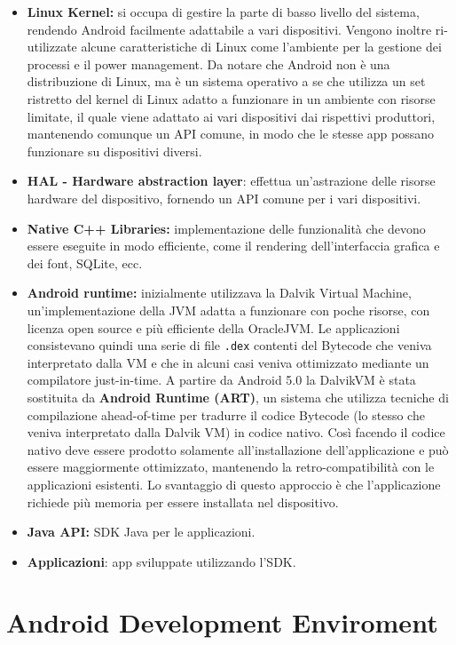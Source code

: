 \begin{itemize}
	\item \textbf{Linux Kernel:} si occupa di gestire la parte di basso livello
		del sistema, rendendo Android facilmente adattabile a vari
		dispositivi. Vengono inoltre ri-utilizzate alcune caratteristiche di
		Linux come l'ambiente per la gestione dei processi e il power
		management. Da notare che Android non è una distribuzione di Linux, ma
		è un sistema operativo a se che utilizza un set ristretto del kernel
		di Linux adatto a funzionare in un ambiente con risorse limitate, il
		quale viene adattato ai vari dispositivi dai rispettivi produttori,
		mantenendo comunque un API comune, in modo che le stesse app possano
		funzionare su dispositivi diversi.
	\item
		\textbf{HAL - Hardware abstraction layer}: effettua un'astrazione
		delle risorse hardware del dispositivo, fornendo un API comune per i
		vari dispositivi.
	\item
		\textbf{Native C++ Libraries:} implementazione delle funzionalità che
		devono essere eseguite in modo efficiente, come il rendering
		dell'interfaccia grafica e dei font, SQLite, ecc.
	\item
		\textbf{Android runtime:} inizialmente utilizzava la Dalvik Virtual
		Machine, un'implementazione della JVM adatta a funzionare con poche
		risorse, con licenza open source e più efficiente della OracleJVM. Le
		applicazioni consistevano quindi una serie di file \texttt{.dex} contenti del
		Bytecode che veniva interpretato dalla VM e che in alcuni casi veniva
		ottimizzato mediante un compilatore just-in-time. A partire da Android
		5.0 la DalvikVM è stata sostituita da \textbf{Android Runtime (ART)},
		un sistema che utilizza tecniche di compilazione ahead-of-time per
		tradurre il codice Bytecode (lo stesso che veniva interpretato dalla
		Dalvik VM) in codice nativo. Così facendo il codice nativo deve essere
		prodotto solamente all'installazione dell'applicazione e può essere
		maggiormente ottimizzato, mantenendo la retro-compatibilità con le
		applicazioni esistenti. Lo svantaggio di questo approccio è che
		l'applicazione richiede più memoria per essere installata nel
		dispositivo.
	\item
		\textbf{Java API:} SDK Java per le applicazioni.
	\item
		\textbf{Applicazioni}: app sviluppate utilizzando l'SDK.
\end{itemize}


\section{Android Development Enviroment}\label{android-development-enviroment}

